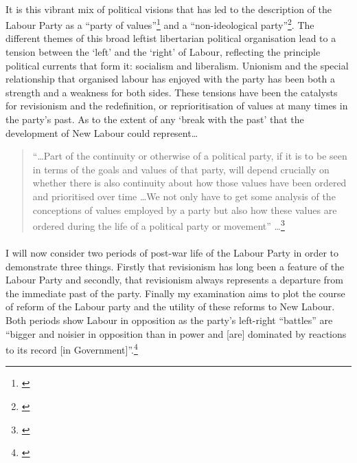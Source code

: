 \documentclass[13pt]{article}
\begin{document}
\begin{onehalfspace}
\paragraph{}It is this vibrant mix of political visions that has led to the description of the Labour Party as a ``party of values''\footnote{\cite[pp. 1]{nlsoul2004}} and a ``non-ideological party''\footnote{\cite[pp. 261]{Mitchell:2004fr}}. The different themes of this broad leftist libertarian political organisation lead to a tension between the `left' and the `right' of Labour, reflecting the principle political currents that form it: socialism and liberalism. Unionism and the special relationship that organised labour has enjoyed with the party has been both a strength and a weakness for both sides. These tensions have been the catalysts for revisionism and the redefinition, or reprioritisation of values at many times in the party's past.  As to the extent of any `break with the past' that the development of New Labour could represent\ldots

\begin{quotation}
``\ldots Part of the continuity or otherwise of a political party, if it is to be seen in terms of the goals and values of that party, will depend crucially on whether there is also continuity about how those values have been ordered and prioritised over time \ldots We not only have to get some analysis of the conceptions of values employed by a party but also how these values are ordered during the life of a political party or movement'' \ldots \footnote{\cite[pp. 116]{Plant:2004fj}}
\end{quotation}

\paragraph{}I will now consider two periods of post-war life of the Labour Party in order to demonstrate three things. Firstly that revisionism has long been a feature of the Labour Party and secondly, that revisionism always represents a departure from the immediate past of the party. Finally my examination aims to plot the course of reform of the Labour party and the utility of these reforms to New Labour. Both periods show Labour in opposition as the party's left-right ``battles'' are ``bigger and noisier in opposition than in power and [are] dominated by reactions to its record [in Government]''.\footnote{\cite{Mitchell:2004fr}}


\end{onehalfspace}
\end{document}
